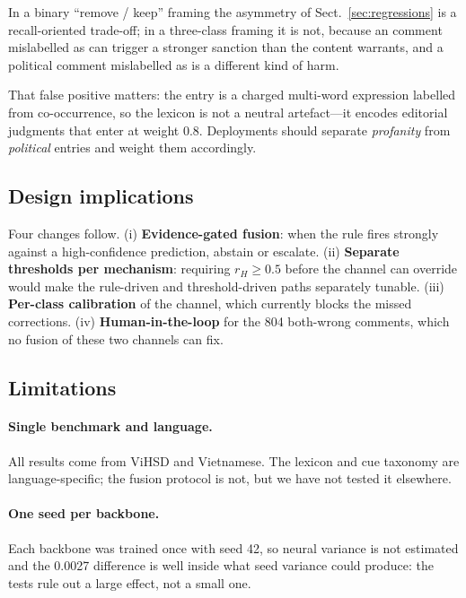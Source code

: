 In a binary ``remove / keep'' framing the asymmetry of
Sect.~\ref{sec:regressions} is a recall-oriented trade-off; in a three-class framing
it is not, because an \off{} comment mislabelled as \hate{} can trigger a stronger
sanction than the content warrants, and a political comment mislabelled as \hate{}
is a different kind of harm.

That false positive matters: the entry is a charged multi-word expression labelled
\hate{} from co-occurrence, so the lexicon is not a neutral artefact---it encodes
editorial judgments that enter at weight 0.8. Deployments should separate
\emph{profanity} from \emph{political} entries and weight them accordingly.

\subsection{Design implications}
\label{sec:implications}

Four changes follow. (i) \textbf{Evidence-gated fusion}: when the rule fires strongly
against a high-confidence \clean{} prediction, abstain or escalate. (ii) \textbf{Separate
thresholds per mechanism}: requiring $r_H\ge0.5$ before the \hate{} channel can override
would make the rule-driven and threshold-driven paths separately tunable. (iii)
\textbf{Per-class calibration} of the \clean{} channel, which currently blocks the missed
corrections. (iv) \textbf{Human-in-the-loop} for the 804 both-wrong comments, which no
fusion of these two channels can fix.

\subsection{Limitations}
\label{sec:limitations}

\paragraph{Single benchmark and language.} All results come from ViHSD and Vietnamese.
The lexicon and cue taxonomy are language-specific; the fusion protocol is not, but we
have not tested it elsewhere.

\paragraph{One seed per backbone.} Each backbone was trained once with seed 42, so
neural variance is not estimated and the 0.0027 difference is well inside what seed
variance could produce: the tests rule out a large effect, not a small one.

